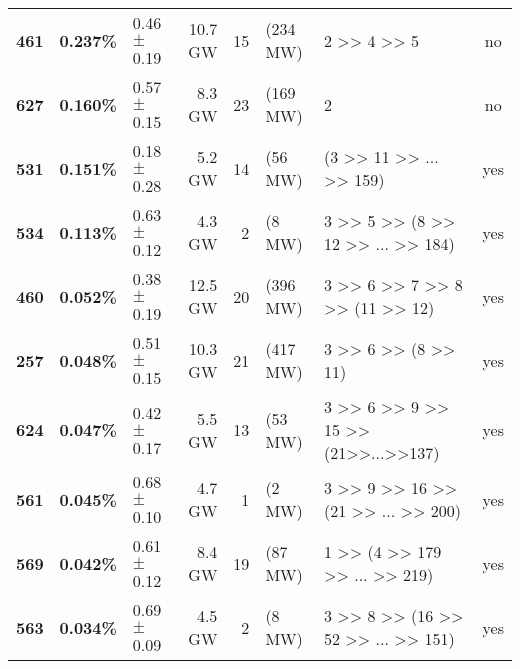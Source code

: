 \begin{tabular}{lll|rrl|lc}
\textbf{461} & \textbf{ 0.237\%} &  0.46$\pm$0.19 &      10.7 GW &     15 & (234 MW) & \multicolumn{1}{p{12em}}{                                    2 >> 4 >> 5 } &                 no \\
\textbf{627} & \textbf{ 0.160\%} &  0.57$\pm$0.15 &       8.3 GW &     23 & (169 MW) & \multicolumn{1}{p{12em}}{                                              2 } &                 no \\
\textbf{531} & \textbf{ 0.151\%} &  0.18$\pm$0.28 &       5.2 GW &      14 & (56 MW) & \multicolumn{1}{p{12em}}{                        (3 >> 11 >> ... >> 159) } &                yes \\
\textbf{534} & \textbf{ 0.113\%} &  0.63$\pm$0.12 &       4.3 GW &        2 & (8 MW) & \multicolumn{1}{p{12em}}{              3 >> 5 >> (8 >> 12 >> ... >> 184) } &                yes \\
\textbf{460} & \textbf{ 0.052\%} &  0.38$\pm$0.19 &      12.5 GW &     20 & (396 MW) & \multicolumn{1}{p{12em}}{                 3 >> 6 >> 7 >> 8 >> (11 >> 12) } &                yes \\
\textbf{257} & \textbf{ 0.048\%} &  0.51$\pm$0.15 &      10.3 GW &     21 & (417 MW) & \multicolumn{1}{p{12em}}{                            3 >> 6 >> (8 >> 11) } &                yes \\
\textbf{624} & \textbf{ 0.047\%} &  0.42$\pm$0.17 &       5.5 GW &      13 & (53 MW) & \multicolumn{1}{p{12em}}{            3 >> 6 >> 9 >> 15 >> (21>>...>>137) } &                yes \\
\textbf{561} & \textbf{ 0.045\%} &  0.68$\pm$0.10 &       4.7 GW &        1 & (2 MW) & \multicolumn{1}{p{12em}}{             3 >> 9 >> 16 >> (21 >> ... >> 200) } &                yes \\
\textbf{569} & \textbf{ 0.042\%} &  0.61$\pm$0.12 &       8.4 GW &      19 & (87 MW) & \multicolumn{1}{p{12em}}{                  1 >> (4 >> 179 >> ... >> 219) } &                yes \\
\textbf{563} & \textbf{ 0.034\%} &  0.69$\pm$0.09 &       4.5 GW &        2 & (8 MW) & \multicolumn{1}{p{12em}}{             3 >> 8 >> (16 >> 52 >> ... >> 151) } &                yes \\

\end{tabular}
